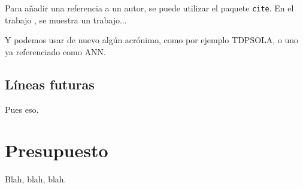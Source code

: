 \documentclass[spanish,openright]{book}
\newcommand{\myreferencespath}{}
\begin{document}
Para añadir una referencia a un autor, se puede utilizar el paquete
\texttt{cite}. En el trabajo \cite{armani03}, se muestra un trabajo...

Y podemos usar de nuevo algún acrónimo, como por ejemplo \ac{TDPSOLA}, o
uno ya referenciado como \ac{ANN}.


\section{Líneas futuras}
\label{sec:lineas-futuras}

Pues eso.










\chapter{Presupuesto}
\label{cha:presupuesto}

Blah, blah, blah.









\newcommand{\mybibfileOne}{biblio/biblio.bib}


\newcommand{\mybibfiles}{\myreferencespath\mybibfileOne}



\end{document}
